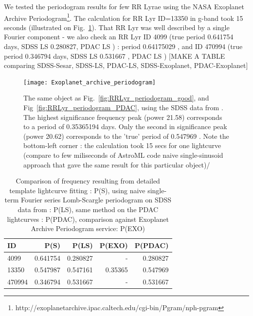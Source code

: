 \documentclass[fleqn,usenatbib]{mnras} %
\begin{document}
We tested the periodogram results for few RR Lyrae using the NASA Exoplanet Archive Periodogram\footnote{http://exoplanetarchive.ipac.caltech.edu/cgi-bin/Pgram/nph-pgram}. The calculation for RR Lyr ID=13350  in g-band took 15 seconds (illustrated on Fig.~\ref{fig:exoplanet_archive}). That RR Lyr was well described by a single Fourier component - we also check an RR Lyr ID 4099 (true period 0.641754 days, SDSS LS 0.280827, PDAC LS  ) : period 0.64175029 , and ID  470994 (true period 0.346794 days, SDSS LS 0.531667 , PDAC LS )
[MAKE A TABLE comparing SDSS-Sesar, SDSS-LS, PDAC-LS,  SDSS-Exoplanet, PDAC-Exoplanet] 

\begin{figure}
\texttt{[image: Exoplanet\_archive\_periodogram]}
\caption{ The same object as Fig.~\ref{fig:RRLyr_periodogram_good}, and Fig~\ref{fig:RRLyr_periodogram_PDAC},  using  the SDSS data from \citep{sesar2010}.  The highest significance frequency peak (power 21.58) corresponds to  a period of 0.35365194 days. Only the second in significance peak (power 20.62) corresponds to the 'true' period of 0.547969 \citep{sesar2010}. Note the bottom-left corner : the calculation took 15 secs for one lightcurve (compare to few miliseconds of AstroML code naive single-sinusoid approach that gave the same result for this particular object)/  }
\label{fig:exoplanet_archive}
\end{figure}



\begin{table}
\centering
\caption{Comparison of frequency resulting from detailed template lightcurve fitting \citep{sesar2010}: P(S), using naive single-term Fourier series Lomb-Scargle periodogram on SDSS data from \citep{sesar2010} : P(LS), same method on the PDAC lightcurves : P(PDAC), comparison against Exoplanet Archive Periodogram service: P(EXO) }
\label{tab:periods}
\begin{tabular}{ l|rrrr } 
\hline
 ID      & P(S) & P(LS) & P(EXO) & P(PDAC) \\ 
\hline
 4099    & 0.641754     & 0.280827   & -            &  0.280827 \\ 
 13350   & 0.547987     & 0.547161   & 0.35365      &  0.547969  \\ 
 470994 & 0.346794     & 0.531667   & -            &  0.531667  \\ 


\end{tabular}
\end{table}
\end{document}
